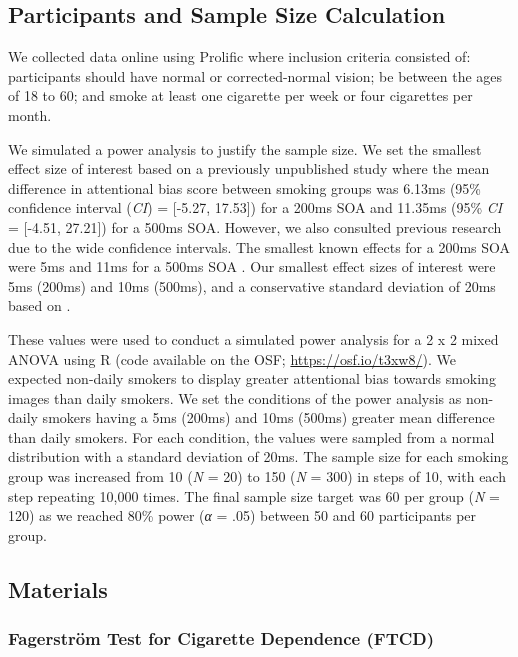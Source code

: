 \documentclass[empirical, authordate]{jote-new-article}
\begin{document}
\subsection{Participants and Sample Size Calculation}

We collected data online using Prolific where inclusion criteria consisted of: participants should have normal or corrected-normal vision; be between the ages of 18 to 60; and smoke at least one cigarette per week or four cigarettes per month.

We simulated a power analysis to justify the sample size. We set the smallest effect size of interest based on a previously unpublished study \parencite{Bartlett2020} where the mean difference in attentional bias score between smoking groups was 6.13ms (95\% confidence interval (\emph{CI}) = [-5.27, 17.53]) for a 200ms SOA and 11.35ms (95\% \emph{CI} = [-4.51, 27.21]) for a 500ms SOA. However, we also consulted previous research due to the wide confidence intervals. The smallest known effects for a 200ms SOA were 5ms \parencite{Chanon2010} and 11ms for a 500ms SOA \parencite{Bradley2003}. Our smallest effect sizes of interest were 5ms (200ms) and 10ms (500ms), and a conservative standard deviation of 20ms based on \textcite{Vollstädt-Klein2011}.

These values were used to conduct a simulated power analysis for a 2 x 2 mixed ANOVA using R (code available on the OSF; \url{https://osf.io/t3xw8/}). We expected non-daily smokers to display greater attentional bias towards smoking images than daily smokers. We set the conditions of the power analysis as non-daily smokers having a 5ms (200ms) and 10ms (500ms) greater mean difference than daily smokers. For each condition, the values were sampled from a normal distribution with a standard deviation of 20ms. The sample size for each smoking group was increased from 10 (\emph{N} = 20) to 150 (\emph{N} = 300) in steps of 10, with each step repeating 10,000 times. The final sample size target was 60 per group (\emph{N} = 120) as we reached 80\% power (\emph{α} = .05) between 50 and 60 participants per group.

\subsection{Materials}

\subsubsection{Fagerström Test for Cigarette Dependence (FTCD)}
\end{document}
